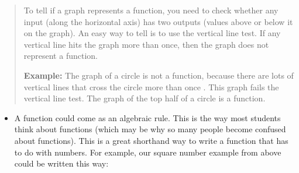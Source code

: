 \begin{quote}
To tell if a graph represents a function, you need to check whether any
input (along the horizontal axis) has two outputs (values above or below
it on the graph). An easy way to tell is to use the vertical line test.
If any vertical line hits the graph more than once, then the graph does
not represent a function.

\textbf{Example:} The graph of a circle is not a function, because there
are lots of vertical lines that cross the circle more than once . This
graph fails the vertical line test. The graph of the top half of a
circle is a function.
\end{quote}

\begin{itemize}
\item
  A function could come as an algebraic rule. This is the way most
  students think about functions (which may be why so many people become
  confused about functions). This is a great shorthand way to write a
  function that has to do with numbers. For example, our square number
  example from above could be written this way:
\end{itemize}

